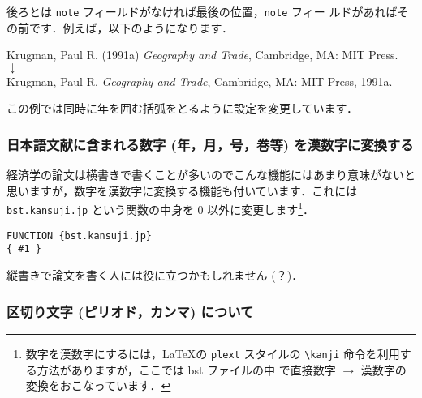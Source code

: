 \documentclass[a4j,10pt]{jarticle}
\begin{document}
後ろとは \texttt{note} フィールドがなければ最後の位置，\texttt{note} フィー
ルドがあればその前です．例えば，以下のようになります．
\begin{center}
 Krugman, Paul R. (1991a) \textit{Geography and Trade}, Cambridge, MA:
 MIT Press. \\
 $\downarrow$ \\
 Krugman, Paul R. \textit{Geography and Trade}, Cambridge, MA: MIT Press, 1991a.
\end{center}
この例では同時に年を囲む括弧をとるように設定を変更しています．

\subsubsection{日本語文献に含まれる数字 (年，月，号，巻等) を漢数字に変換する}

経済学の論文は横書きで書くことが多いのでこんな機能にはあまり意味がないと
思いますが，数字を漢数字に変換する機能も付いています．これには 
\texttt{bst.kansuji.jp} という関数の中身を 0 以外に変更します\footnote
{数字を漢数字にするには，\LaTeX の \texttt{plext} スタイルの 
\verb|\kanji| 命令を利用する方法がありますが，ここでは bst ファイルの中
で直接数字 $\rightarrow$ 漢数字の変換をおこなっています．}．
\begin{screen}
\begin{verbatim}
FUNCTION {bst.kansuji.jp}
{ #1 }
\end{verbatim}
\end{screen}

縦書きで論文を書く人には役に立つかもしれません (？)．

\subsubsection{区切り文字 (ピリオド，カンマ) について}
\end{document}
